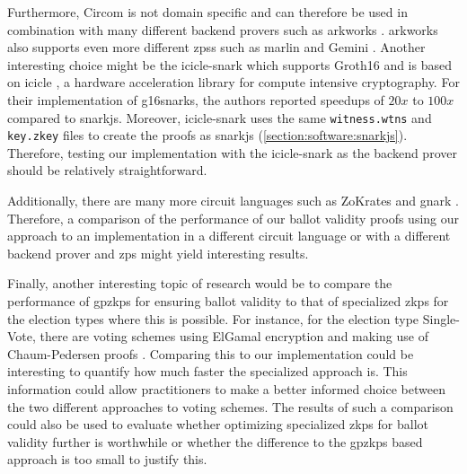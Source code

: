 Furthermore, Circom is not domain specific and can therefore be used in combination with many different backend provers such as arkworks \cite{yuncong_hu_arkworks_2025}.
arkworks also supports even more different \glspl{zps} such as marlin and Gemini \cite{chiesa_marlin_2019,bootle_gemini_2022}.
Another interesting choice might be the icicle-snark \cite{ingonyama_ingonyama-zkicicle-snark_2025} which supports Groth16 and is based on icicle \cite{ingonyama_icicle_2024, ingonyama_introducing_2023}, a hardware acceleration library for compute intensive cryptography.
For their implementation of \glspl{g16snark}, the authors reported speedups of $20x$ to $100x$ compared to snarkjs.
Moreover, icicle-snark uses the same \verb|witness.wtns| and \verb|key.zkey| files to create the proofs as snarkjs (\cref{section:software:snarkjs}).
Therefore, testing our implementation with the icicle-snark as the backend prover should be relatively straightforward.

Additionally, there are many more circuit languages such as ZoKrates and gnark \cite{zokrates_zokrateszokrates_2025, consensys_consensysgnark_2025}.
Therefore, a comparison of the performance of our ballot validity proofs using our approach to an implementation in a different circuit language or with a different backend prover and \gls{zps} might yield interesting results.

Finally, another interesting topic of research would be to compare the performance of \glspl{gpzkp} for ensuring ballot validity to that of specialized \glspl{zkp} for the election types where this is possible.
For instance, for the election type Single-Vote, there are voting schemes using ElGamal encryption and making use of Chaum-Pedersen proofs \cite{cramer_secure_1997}.
Comparing this to our implementation could be interesting to quantify how much faster the specialized approach is.
This information could allow practitioners to make a better informed choice between the two different approaches to voting schemes.
The results of such a comparison could also be used to evaluate whether optimizing specialized \glspl{zkp} for ballot validity further is worthwhile or whether the difference to the \glspl{gpzkp} based approach is too small to justify this.


